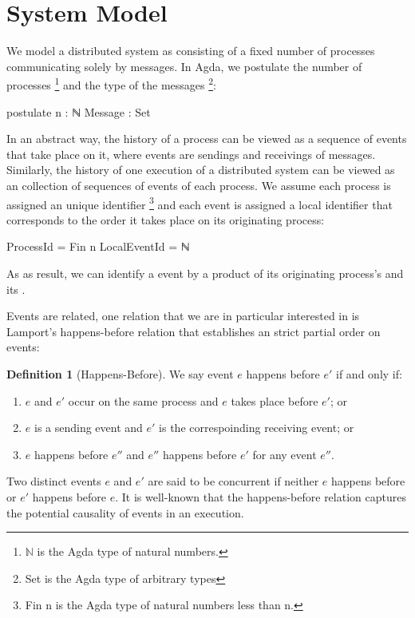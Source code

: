 \documentclass[acmsmall,review,anonymous]{acmart}
\theoremstyle{definition}
\newtheorem{definition}{Definition}
\theoremstyle{theorem}
\begin{document}
\section{System Model}
We model a distributed system as consisting of a fixed number of
processes communicating solely by messages. In Agda, we postulate the
number of processes \footnote{\ensuremath{\mathbb{N}} is
the Agda type of natural numbers.} and the type of the messages
\footnote{Set is the Agda type of arbitrary types}:
\begin{code}
postulate
  n : ℕ
  Message : Set
\end{code}
In an abstract way, the history of a process can be viewed as a
sequence of events that take place on it, where events are sendings
and receivings of messages. Similarly, the history of one execution of
a distributed system can be viewed as an collection of sequences of
events of each process. We assume each process is assigned an unique
identifier \footnote{Fin n is the Agda type of
natural numbers less than n.} and each event is assigned a local
identifier  that corresponds to the order it
takes place on its originating process:
\begin{code}
ProcessId = Fin n
LocalEventId = ℕ
\end{code}
\noindent As as result, we can identify
a event by a product of its originating process's 
and its .

Events are related, one relation that we are in particular interested
in is Lamport's happens-before relation that establishes an strict
partial order on events:
\begin{definition}[Happens-Before]
  We say event $e$ happens before $e'$ if and only if:
  \begin{enumerate}
  \item $e$ and $e'$ occur on the same process and $e$ takes place before $e'$; or
  \item $e$ is a sending event and $e'$ is the correspoinding receiving event; or
  \item $e$ happens before $e''$ and $e''$ happens before $e'$ for any event $e''$.
  \end{enumerate}
\end{definition}
\noindent Two distinct events $e$ and $e'$ are said to be concurrent
if neither $e$ happens before or $e'$ happens before $e$.  It is
well-known that the happens-before relation captures the potential
causality of events in an execution.
\end{document}
